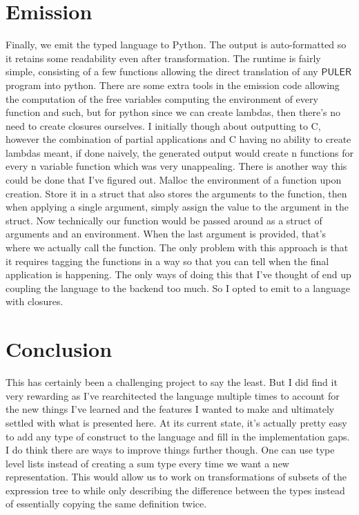 \documentclass{article} %
\newcommand{\PULER}{\mathsf{PULER}}
\begin{document}
\section {Emission}
    Finally, we emit the typed language to Python. The output is auto-formatted so it retains some readability even after transformation. The runtime is fairly simple, consisting of a few functions allowing the direct translation of any $\PULER$ program into python. There are some extra tools in the emission code allowing the computation of the free variables computing the environment of every function and such, but for python since we can create lambdas, then there's no need to create closures ourselves. I initially though about outputting to C, however the combination of partial applications and C having no ability to create lambdas meant, if done naively, the generated output would create n functions for every n variable function which was very unappealing. There is another way this could be done that I've figured out. Malloc the environment of a function upon creation. Store it in a struct that also stores the arguments to the function, then when applying a single argument, simply assign the value to the argument in the struct. Now technically our function would be passed around as a struct of arguments and an environment. When the last argument is provided, that's where we actually call the function. The only problem with this approach is that it requires tagging the functions in a way so that you can tell when the final application is happening. The only ways of doing this that I've thought of end up coupling the language to the backend too much. So I opted to emit to a language with closures.
\section {Conclusion}
    This has certainly been a challenging project to say the least. But I did find it very rewarding as I've rearchitected the language multiple times to account for the new things I've learned and the features I wanted to make and ultimately settled with what is presented here. At its current state, it's actually pretty easy to add any type of construct to the language and fill in the implementation gaps. I do think there are ways to improve things further though. One can use type level lists instead of creating a sum type every time we want a new representation. This would allow us to work on transformations of subsets of the expression tree to while only describing the difference between the types instead of essentially copying the same definition twice. 




\end{document}
